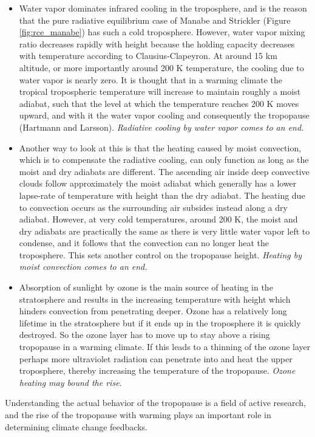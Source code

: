 \documentclass[12pt]{book}
\begin{document}
\begin{itemize}
\item
Water vapor dominates infrared cooling in the troposphere, and is the reason that the pure radiative equilibrium case of Manabe and Strickler (Figure \ref{fig:rce_manabe}) has such a cold troposphere. However, water vapor mixing ratio decreases rapidly with height because the holding capacity decreases with temperature according to Clausius-Clapeyron. At around 15 km altitude, or more importantly around 200 K temperature, the cooling due to water vapor is nearly zero. It is thought that in a warming climate the tropical tropospheric temperature will increase to maintain roughly a moist adiabat, such that the level at which the temperature reaches 200 K moves upward, and with it the water vapor cooling and consequently the tropopause (Hartmann and Larsson\cite{Hartmann2002}). {\em Radiative cooling by water vapor comes to an end.}
\item
Another way to look at this is that the heating caused by moist convection, which is to compensate the radiative cooling, can only function as long as the moist and dry adiabats are different. The ascending air inside deep convective clouds follow approximately the moist adiabat which generally has a lower lapse-rate of temperature with height than the dry adiabat. The heating due to convection occurs as the surrounding air subsides instead along a dry adiabat. However, at very cold temperatures, around 200 K, the moist and dry adiabats are practically the same as there is very little water vapor left to condense, and it follows that the convection can no longer heat the troposphere. This sets another control on the tropopause height. {\em Heating by moist convection comes to an end.}
\item
Absorption of sunlight by ozone is the main source of heating in the stratosphere and results in the increasing temperature with height which hinders convection from penetrating deeper. Ozone has a relatively long lifetime in the stratosphere but if it ends up in the troposphere it is quickly destroyed. So the ozone layer has to move up to stay above a rising tropopause in a warming climate. If this leads to a thinning of the ozone layer perhaps more ultraviolet radiation can penetrate into and heat the upper troposphere, thereby increasing the temperature of the tropopause. {\em Ozone heating may bound the rise.}
\end{itemize}
Understanding the actual behavior of the tropopause is a field of active research, and the rise of the tropopause with warming plays an important role in determining climate change feedbacks. 
\end{document}
